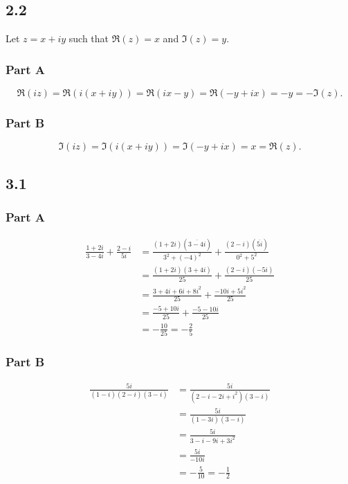 \documentclass[12pt,titlepage]{extarticle}
\begin{document}

\subsection*{2.2}
Let $z = x + iy$ such that $\Re(z) = x$ and $\Im(z) = y$.
\subsubsection*{Part A}

\[
    \Re(iz) = \Re(i(x + iy)) = \Re(ix - y) = \Re(- y + ix) = -y = -\Im(z)
.\]

\subsubsection*{Part B}
\[
    \Im(iz) = \Im(i(x + iy)) = \Im(- y + ix) = x = \Re(z)
.\]

\subsection*{3.1}
\subsubsection*{Part A}
\begin{align*}
    \frac{1+2i}{3-4i} + \frac{2-i}{5i} &=
    \frac{(1+2i)(\overline{3-4i})}{3^2 + (-4)^2} + \frac{(2-i)(\overline{5i})}{0^2 + 5^2} \\
    &= \frac{(1+2i)(3+4i)}{25} + \frac{(2-i)(-5i)}{25} \\
    &= \frac{3 + 4i + 6i + 8i^2}{25} + \frac{-10i + 5i^2}{25} \\
    &= \frac{-5 + 10i}{25} + \frac{-5 -10i}{25} \\
    &= -\frac{10}{25} = - \frac{2}{5}
\end{align*}

\subsubsection*{Part B}
\begin{align*}
    \frac{5i}{(1-i)(2-i)(3-i)} &= \frac{5i}{(2 - i - 2i + i^2)(3-i)} \\
    &= \frac{5i}{(1 - 3i)(3 - i)} \\
    &= \frac{5i}{3 - i - 9i + 3i^2} \\
    &= \frac{5i}{-10i} \\
    &= -\frac{5}{10} = -\frac{1}{2}
\end{align*}
\end{document}
